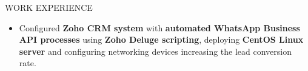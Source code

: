 \documentclass{resume} %
\begin{document}
\begin{rSection}{WORK EXPERIENCE}
    \begin{itemize}
        \itemsep -6pt {}
        
              \item Configured \textbf{Zoho CRM system} with \textbf{automated WhatsApp Business API processes} using \textbf{Zoho Deluge scripting}, deploying \textbf{CentOS Linux server} and configuring networking devices increasing the lead conversion rate.
    \end{itemize}
\end{rSection}

\end{document}
